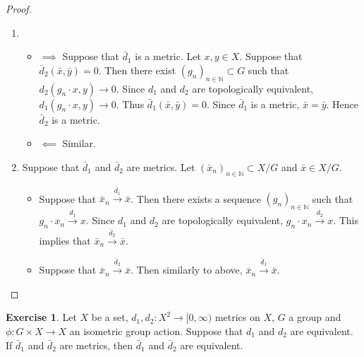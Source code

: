 \documentclass[12pt]{amsart}
\theoremstyle{definition}
\newtheorem{ex}[definition]{Exercise}
\newcommand{\N}{\mathbb{N}}
\newcommand{\Rg}{[0,\infty)}
\newcommand{\conv}[1]{\xrightarrow{#1}}
\newcommand{\lex}[1]{\label{ex:#1}}
\begin{document}
	\begin{proof}\
	\begin{enumerate}
	\item 
	\begin{itemize}
	\item $\implies$ Suppose that $\bar{d}_1$ is a metric. Let $x,y \in X$. Suppose that $\bar{d}_2(\bar{x}, \bar{y}) = 0$. Then there exist $(g_n)_{n \in \N} \subset G$ such that $d_2(g_n \cdot x, y) \rightarrow 0$. Since $d_1$ and $d_2$ are topologically equivalent, $d_1(g_n \cdot x, y) \rightarrow 0$. Thus $\bar{d}_1(\bar{x}, \bar{y}) = 0$. Since $\bar{d}_1$ is a metric, $\bar{x} = \bar{y}$. Hence $\bar{d}_2$ is a metric. 
	\item $\impliedby$ Similar.
	\end{itemize}
	\item Suppose that $\bar{d}_1$ and $\bar{d}_2$ are metrics. Let $(\bar{x}_n)_{n \in \N} \subset X/G$ and $\bar{x} \in X/G$. 
	\begin{itemize}
	\item Suppose that $\bar{x}_n \conv{\bar{d}_1} \bar{x}$. Then there exists a sequence $(g_n)_{n \in \N}$ such that $g_n \cdot x_n \conv{d_1} x$. Since $d_1$ and $d_2$ are topologically equivalent, $g_n \cdot x_n \conv{d_2} x$. This implies that $\bar{x}_n \conv{\bar{d}_2} \bar{x}$. 
	\item Suppose that $\bar{x}_n \conv{\bar{d}_2} \bar{x}$. Then similarly to above, $\bar{x}_n \conv{\bar{d}_1} \bar{x}$.
	\end{itemize}
	\end{enumerate}
	\end{proof}	
	
	\begin{ex} \lex{}
	Let $X$ be a set, $d_1, d_2: X^2 \rightarrow \Rg$ metrics on $X$, $G$ a group and $\phi: G \times X \rightarrow X$ an isometric group action. Suppose that $d_1$ and $d_2$ are equivalent. If $\bar{d}_1$ and $\bar{d}_2$ are metrics, then $\bar{d}_1$ and $\bar{d}_2$ are equivalent.
	\end{ex}
	
\end{document}
